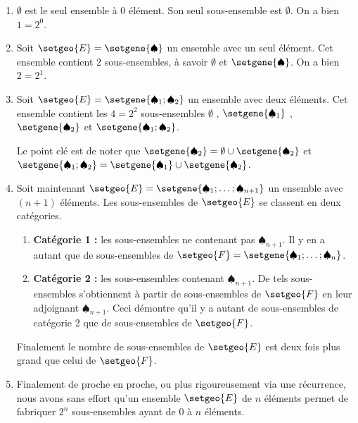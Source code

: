 \documentclass[12pt]{amsart}
\begin{document}
\begin{enumerate}
	\medskip
	\item $\emptyset$ est le seul ensemble à $0$ élément. Son seul sous-ensemble est $\emptyset$. On a bien $1 = 2^0$.


	\medskip
	\item Soit $\setgeo{E} = \setgene{\spadesuit}$ un ensemble avec un seul élément. Cet ensemble contient $2$ sous-ensembles, à savoir $\emptyset$ et $\setgene{\spadesuit}$. On a bien $2 = 2^1$.


	\medskip
	\item Soit $\setgeo{E} = \setgene{\spadesuit_1 ; \spadesuit_2}$ un ensemble avec deux éléments.
	      Cet ensemble contient les $4 = 2^2$ sous-ensembles
	      $\emptyset$ , $\setgene{\spadesuit_1}$ ,
	      $\setgene{\spadesuit_2}$ et $\setgene{\spadesuit_1 ; \spadesuit_2}$.
	
	      \noindent
	      Le point clé est de noter que
	      $\setgene{\spadesuit_2} = \emptyset \cup \setgene{\spadesuit_2}$ et
	      $\setgene{\spadesuit_1 ; \spadesuit_2} = \setgene{\spadesuit_1} \cup \setgene{\spadesuit_2}$.

	\medskip
	\item Soit maintenant $\setgeo{E} = \setgene{\spadesuit_1 ; \dots ; \spadesuit_{n+1}}$ un ensemble avec $(n+1)$ éléments.
		  Les sous-ensembles de $\setgeo{E}$ se classent en deux catégories.
		  
		  \begin{enumerate}
		  		\smallskip
				\item \textbf{Catégorie 1 :} les sous-ensembles ne contenant pas $\spadesuit_{n+1}$.
				      Il y en a autant que de sous-ensembles de $\setgeo{F} = \setgene{\spadesuit_1 ; \dots ; \spadesuit_{n}}$.
		  		
				\smallskip
				\item \textbf{Catégorie 2 :} les sous-ensembles contenant $\spadesuit_{n+1}$.
				      De tels sous-ensembles s'obtiennent à partir de sous-ensembles de $\setgeo{F}$ en leur adjoignant $\spadesuit_{n+1}$.
				      Ceci démontre qu'il y a autant de sous-ensembles de catégorie 2 que de sous-ensembles de $\setgeo{F}$.
		  \end{enumerate}

		  \noindent
		  Finalement le nombre de sous-ensembles de $\setgeo{E}$ est deux fois plus grand que celui de $\setgeo{F}$.


	\medskip
	\item Finalement de proche en proche, ou plus rigoureusement via une récurrence, nous avons sans effort qu'un ensemble $\setgeo{E}$ de $n$ éléments permet de fabriquer $2^n$ sous-ensembles ayant de $0$ à $n$ éléments.
\end{enumerate}
\end{document}
